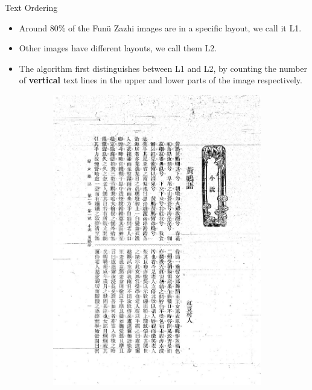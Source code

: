 \documentclass{beamer}
\begin{document}
\begin{frame}
    \begin{center}
        \Large{Text Ordering}
    \end{center}
    \begin{itemize}
        \item Around 80\% of the Funü Zazhi images are in a specific layout, we call it L1.
        \item Other images have different layouts, we call them L2.
        \item The algorithm first distinguishes between L1 and L2, by counting the number of \textbf{vertical} text lines in the upper and lower parts of the image respectively.
    \end{itemize}
    \begin{figure}[htbp]
        \centering
        \begin{subfigure}[b]{0.23\linewidth}
            \includegraphics[height=1.3\linewidth]{./figures/fnzz2}
        \end{subfigure}

\end{figure}
\end{frame}
\end{document}
